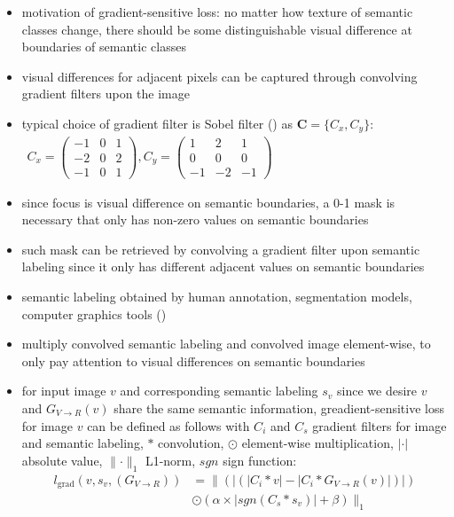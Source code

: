 \begin{itemize}
	\item motivation of gradient-sensitive loss: no matter how texture of semantic classes change, there should be some distinguishable visual difference at boundaries of semantic classes
	\item visual differences for adjacent pixels can be captured through convolving gradient filters upon the image
	\item typical choice of gradient filter is Sobel filter () as $\mathbf{C} = \{C_x, C_y\}$:
	$\begin{array}{cc}
		C_x = 
		\begin{pmatrix}
			-1 & 0 & 1\\
			-2 & 0 & 2\\
			-1 & 0 & 1
		\end{pmatrix},
		C_y = 
		\begin{pmatrix}
			1 & 2 & 1\\
			0 & 0 & 0\\
			-1 & -2 & -1
		\end{pmatrix}
	\end{array}$
	\item since focus is visual difference on semantic boundaries, a 0-1 mask is necessary that only has non-zero values on semantic boundaries
	\item such mask can be retrieved by convolving a gradient filter upon semantic labeling since it only has different adjacent values on semantic boundaries
	\item semantic labeling obtained by human annotation, segmentation models, computer graphics tools ()
	\item multiply convolved semantic labeling and convolved image element-wise, to only pay attention to visual differences on semantic boundaries
	\item for input image $v$ and corresponding semantic labeling $s_v$ since we desire $v$ and $G_{V\rightarrow R}(v)$ share the same semantic information, greadient-sensitive loss for image $v$ can be defined as follows with $C_i$ and $C_s$ gradient filters for image and semantic labeling, $*$ convolution, $\odot$ element-wise multiplication, $|\cdot|$ absolute value,
	$\lVert \cdot \rVert_1$ L1-norm, $sgn$ sign function:
	\begin{align}
		l_{\text{grad}}(v,s_v,(G_{V\rightarrow R})) &= \lVert(|(|C_i * v |-|C_i*G_{V\rightarrow R}(v)|)|)\\
		&\odot (\alpha \times |sgn(C_s*s_v)|+ \beta)\rVert_1\\

\end{align}
\end{itemize}
